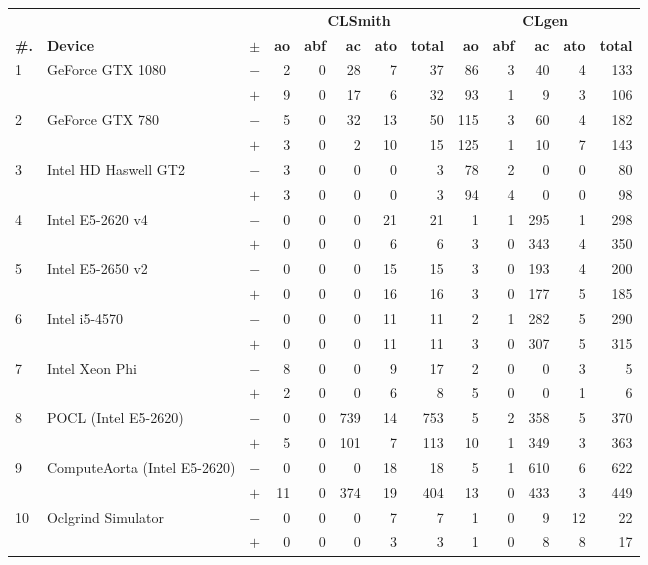 \begin{tabular}{lll | rrrrr | rrrrr }
  \toprule
  & & & \multicolumn{5}{c|}{\textbf{CLSmith}} & \multicolumn{5}{c}{\textbf{CLgen}} \\
  \textbf{\#.} & \textbf{Device} & $\pm$ &
  \textbf{ao} & \textbf{abf} & \textbf{ac} & \textbf{ato} & \textbf{total} &
  \textbf{ao} & \textbf{abf} & \textbf{ac} & \textbf{ato} & \textbf{total} \\
  \midrule
  \multirow{ 2}{*}{1} & \multirow{ 2}{*}{GeForce GTX 1080} & $-$ & 2 & 0 & 28 & 7 & 37       & 86 & 3 & 40 & 4 & 133 \\& & $+$ & 9 & 0 & 17 & 6 & 32 & 93 & 1 & 9 & 3 & 106 \\
\hline
\multirow{ 2}{*}{2} & \multirow{ 2}{*}{GeForce GTX 780} & $-$ & 5 & 0 & 32 & 13 & 50       & 115 & 3 & 60 & 4 & 182 \\& & $+$ & 3 & 0 & 2 & 10 & 15 & 125 & 1 & 10 & 7 & 143 \\
\hline
\multirow{ 2}{*}{3} & \multirow{ 2}{*}{Intel HD Haswell GT2} & $-$ & 3 & 0 & 0 & 0 & 3       & 78 & 2 & 0 & 0 & 80 \\& & $+$ & 3 & 0 & 0 & 0 & 3 & 94 & 4 & 0 & 0 & 98 \\
\hline
\multirow{ 2}{*}{4} & \multirow{ 2}{*}{Intel E5-2620 v4} & $-$ & 0 & 0 & 0 & 21 & 21       & 1 & 1 & 295 & 1 & 298 \\& & $+$ & 0 & 0 & 0 & 6 & 6 & 3 & 0 & 343 & 4 & 350 \\
\hline
\multirow{ 2}{*}{5} & \multirow{ 2}{*}{Intel E5-2650 v2} & $-$ & 0 & 0 & 0 & 15 & 15       & 3 & 0 & 193 & 4 & 200 \\& & $+$ & 0 & 0 & 0 & 16 & 16 & 3 & 0 & 177 & 5 & 185 \\
\hline
\multirow{ 2}{*}{6} & \multirow{ 2}{*}{Intel i5-4570} & $-$ & 0 & 0 & 0 & 11 & 11       & 2 & 1 & 282 & 5 & 290 \\& & $+$ & 0 & 0 & 0 & 11 & 11 & 3 & 0 & 307 & 5 & 315 \\
\hline
\multirow{ 2}{*}{7} & \multirow{ 2}{*}{Intel Xeon Phi} & $-$ & 8 & 0 & 0 & 9 & 17       & 2 & 0 & 0 & 3 & 5 \\& & $+$ & 2 & 0 & 0 & 6 & 8 & 5 & 0 & 0 & 1 & 6 \\
\hline
\multirow{ 2}{*}{8} & \multirow{ 2}{*}{POCL (Intel E5-2620)} & $-$ & 0 & 0 & 739 & 14 & 753       & 5 & 2 & 358 & 5 & 370 \\& & $+$ & 5 & 0 & 101 & 7 & 113 & 10 & 1 & 349 & 3 & 363 \\
\hline
\multirow{ 2}{*}{9} & \multirow{ 2}{*}{ComputeAorta (Intel E5-2620)} & $-$ & 0 & 0 & 0 & 18 & 18       & 5 & 1 & 610 & 6 & 622 \\& & $+$ & 11 & 0 & 374 & 19 & 404 & 13 & 0 & 433 & 3 & 449 \\
\hline
\multirow{ 2}{*}{10} & \multirow{ 2}{*}{Oclgrind Simulator} & $-$ & 0 & 0 & 0 & 7 & 7       & 1 & 0 & 9 & 12 & 22 \\& & $+$ & 0 & 0 & 0 & 3 & 3 & 1 & 0 & 8 & 8 & 17 \\
  \bottomrule
\end{tabular}

